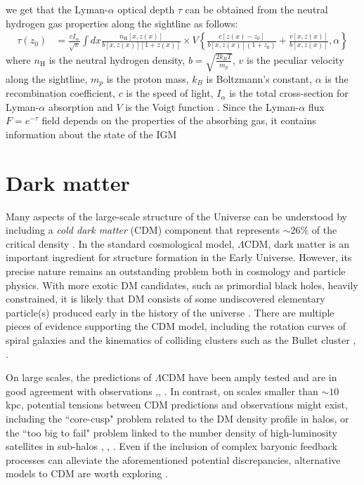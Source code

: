we get that the Lyman-$\alpha$ optical depth $\tau$ can be obtained from the neutral hydrogen gas properties along the sightline as follows:
\begin{equation}\label{eq:lyman opacity}
    \begin{aligned}\tau(z_0)&=\frac{cI_\alpha}{\sqrt{\pi}}\int dx\frac{n_{\mathrm{H}}[x,z(x)]}{b[x,z(x)][1+z(x)]}\times V\left\{\frac{c[z(x)-z_0]}{b[x,z(x)](1+z_0)}+\frac{v[x,z(x)]}{b[x,z(x)]},\alpha\right\}\end{aligned}
\end{equation} 
where $n_\text{H}$ is the neutral hydrogen density, $b=\sqrt{\frac{2k_BT}{m_p}}$, $v$ is the peculiar velocity along the sightline, $m_p$ is the proton mass, $k_B$ is Boltzmann's constant, $\alpha$ is the recombination coefficient, $c$ is the speed of light, $I_\alpha$ is the total cross-section for Lyman-$\alpha$ absorption and $V$ is the Voigt function \cite{Choudhury_2001}. Since the Lyman-$\alpha$ flux $F=e^{-\tau}$ field depends on the properties of the absorbing gas, it contains information about the state of the IGM



\section{Dark matter}\label{sec:DM}

Many aspects of the large-scale structure of the Universe can be understood by including a \emph{cold dark matter} (CDM) component that represents $\sim 26 \%$ of the critical density \cite{planck2014}. In the standard cosmological model, $\Lambda$CDM, dark matter is an important ingredient for structure formation in the Early Universe. However, its precise nature remains an outstanding problem both in cosmology and particle physics. With more exotic DM candidates, such as primordial black holes, heavily constrained, it is likely that DM consists of some undiscovered elementary particle(s) produced early in the history of the universe \cite{Villanueva_Domingo_2021}. There are multiple pieces of evidence supporting the CDM model, including the rotation curves of spiral galaxies and the kinematics of colliding clusters such as the Bullet cluster \cite{Navarro1996}, \cite{de_Blok_2008}.

On large scales, the predictions of $\Lambda$CDM have been amply tested and are in good agreement with observations \cite{Dalal2002},\cite{VanWaerbeke2004}, \cite{Eisenstein2005}. In contrast, on scales smaller than $\sim 10$ kpc, potential tensions between CDM predictions and observations might exist, including the ``core-cusp" problem related to the DM density profile in halos, or the ``too big to fail" problem linked to the number density of high-luminosity satellites in sub-halos \cite{Moore1994}, \cite{Boylan_Kolchin_2011}, \cite{Weinberg_2015}. Even if the inclusion of complex baryonic feedback processes can alleviate the aforementioned potential discrepancies, alternative models to CDM are worth exploring \cite{Vogelsberger2014}.  

